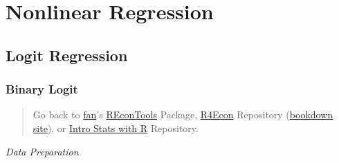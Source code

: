 \documentclass[
]{book}
\newenvironment{Shaded}{\begin{snugshade}}{\end{snugshade}}
\newcommand{\CommentTok}[1]{\textcolor[rgb]{0.56,0.35,0.01}{\textit{#1}}}
\newcommand{\DataTypeTok}[1]{\textcolor[rgb]{0.13,0.29,0.53}{#1}}
\newcommand{\DecValTok}[1]{\textcolor[rgb]{0.00,0.00,0.81}{#1}}
\newcommand{\ErrorTok}[1]{\textcolor[rgb]{0.64,0.00,0.00}{\textbf{#1}}}
\newcommand{\KeywordTok}[1]{\textcolor[rgb]{0.13,0.29,0.53}{\textbf{#1}}}
\newcommand{\NormalTok}[1]{#1}
\newcommand{\OperatorTok}[1]{\textcolor[rgb]{0.81,0.36,0.00}{\textbf{#1}}}
\newcommand{\OtherTok}[1]{\textcolor[rgb]{0.56,0.35,0.01}{#1}}
\newcommand{\StringTok}[1]{\textcolor[rgb]{0.31,0.60,0.02}{#1}}
\begin{document}
\hypertarget{nonlinear-regression}{%
\chapter{Nonlinear Regression}\label{nonlinear-regression}}

\hypertarget{logit-regression}{%
\section{Logit Regression}\label{logit-regression}}

\hypertarget{binary-logit}{%
\subsection{Binary Logit}\label{binary-logit}}

\begin{quote}
Go back to \href{http://fanwangecon.github.io/}{fan}'s \href{https://fanwangecon.github.io/REconTools/}{REconTools} Package, \href{https://fanwangecon.github.io/R4Econ/}{R4Econ} Repository (\href{https://fanwangecon.github.io/R4Econ/bookdown}{bookdown site}), or \href{https://fanwangecon.github.io/Stat4Econ/}{Intro Stats with R} Repository.
\end{quote}

\emph{Data Preparation}

\begin{Shaded}
\end{Shaded}
\end{document}
